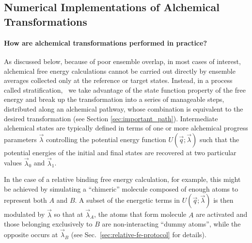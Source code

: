 \documentclass[9pt,bestpractices]{livecoms}
\begin{document}
\subsection{Numerical Implementations of Alchemical Transformations}
\label{subsec:numerical-implementations}

\paragraph{How are alchemical transformations performed in practice?}

As discussed below, because of poor ensemble overlap, in most cases of interest, alchemical free energy calculations cannot be carried out directly by ensemble averages collected only at the reference or target states. Instead, in a process called stratification,~\cite{chipot2007free} we take advantage of the state function property of the free energy and break up the transformation into a series of manageable steps, distributed along an alchemical pathway, whose combination is equivalent to the desired transformation (see Section \ref{sec:important_path}). Intermediate alchemical states are typically defined in terms of one or more alchemical progress parameters $\vec{\lambda}$ controlling the potential energy function $U(\vec{q};\vec{\lambda})$ such that the potential energies of the initial and final states are recovered at two particular values $\vec{\lambda}_0$ and $\vec{\lambda}_1$.

In the case of a relative binding free energy calculation, for example, this might be achieved by simulating a ``chimeric'' molecule composed of enough atoms to represent both $A$ and $B$. A subset of the energetic terms in $U(\vec{q};\vec{\lambda})$ is then modulated by $\vec{\lambda}$ so that at $\vec{\lambda}_A$, the atoms that form molecule $A$ are activated and those belonging exclusively to $B$ are non-interacting ``dummy atoms'', while the opposite occurs at $\vec{\lambda}_B$ (see Sec.~\ref{sec:relative-fe-protocol} for details).
\end{document}
